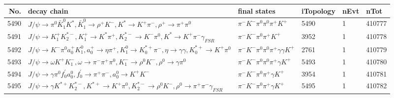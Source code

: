 \begin{table}[htbp] 
\begin{center}
\begin{small}
\begin{tabular}{rlllll}\hline\hline
 No. & decay chain & final states &  iTopology & nEvt & nTot \\\hline
5490&$J/\psi       \rightarrow \pi^{0}        \bar{K}_1^{0} K^{*}          , \bar{K}_1^{0}  \rightarrow \rho^{+}      K^{-}          , K^{*}           \rightarrow K^{+}          \pi^{-}        , \rho^{+}       \rightarrow \pi^{+}        \pi^{0}        $&$\pi^{-}        K^{-}          \pi^{0}        \pi^{0}        \pi^{+}        K^{+}          $& 5490&    1&410777\\
5491&$J/\psi       \rightarrow K_1^{+}        K_2^{*-}       , K_1^{+}         \rightarrow K^{*}          \pi^{+}        , K_2^{*-}        \rightarrow K^{-}          \pi^{0}        , K^{*}           \rightarrow K^{+}          \pi^{-}        \gamma_{FSR} $&$\pi^{-}        K^{-}          \pi^{0}        \pi^{+}        K^{+}          $& 3952&    1&410778\\
5492&$J/\psi       \rightarrow K^{-}          \pi^{0}        a_{0}^{+}      K_1^{0}        , a_{0}^{+}       \rightarrow \eta          \pi^{+}        , K_1^{0}         \rightarrow K_{0}^{*+}     \pi^{-}        , \eta           \rightarrow \gamma       \gamma       , K_{0}^{*+}      \rightarrow K^{+}          \pi^{0}        $&$\pi^{-}        K^{-}          \pi^{0}        \pi^{0}        \pi^{+}        \gamma       \gamma       K^{+}          $& 2761&    1&410779\\
5493&$J/\psi       \rightarrow \omega         K^{+}          K_{1}^{-}      , \omega          \rightarrow \pi^{-}        \pi^{+}        \pi^{0}        , K_{1}^{-}       \rightarrow \rho^{0}      K^{-}          , \rho^{0}       \rightarrow \gamma       \pi^{0}        $&$\pi^{-}        K^{-}          \pi^{0}        \pi^{0}        \pi^{+}        \gamma       K^{+}          $& 5493&    1&410780\\
5494&$J/\psi       \rightarrow \gamma       \pi^{0}        f^{'}_{0}     a_{0}^{0}      , f^{'}_{0}      \rightarrow \pi^{+}        \pi^{-}        , a_{0}^{0}       \rightarrow K^{+}          K^{-}          $&$\pi^{-}        K^{-}          \pi^{0}        \pi^{+}        \gamma       K^{+}          $& 3954&    1&410781\\
5495&$J/\psi       \rightarrow \gamma       K^{*+}         K_2^{*-}       , K^{*+}          \rightarrow K^{+}          \pi^{0}        , K_2^{*-}        \rightarrow \rho^{0}      K^{-}          , \rho^{0}       \rightarrow \pi^{+}        \pi^{-}        \gamma_{FSR} $&$\pi^{-}        K^{-}          \pi^{0}        \pi^{+}        \gamma       K^{+}          $& 5495&    1&410782\\

\end{tabular}
\end{small}
\end{center}
\end{table}
